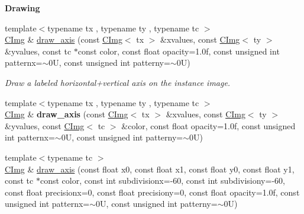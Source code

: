 \begin{Indent}{\bf Drawing}
\begin{DoxyCompactItemize}
\item 
\hypertarget{structcimg__library_1_1_c_img_a51d3f13753cc1b69c8250441dad0fb20}{{\footnotesize template$<$typename tx , typename ty , typename tc $>$ }\\\hyperlink{structcimg__library_1_1_c_img}{C\-Img} \& \hyperlink{structcimg__library_1_1_c_img_a51d3f13753cc1b69c8250441dad0fb20}{draw\-\_\-axis} (const \hyperlink{structcimg__library_1_1_c_img}{C\-Img}$<$ tx $>$ \&xvalues, const \hyperlink{structcimg__library_1_1_c_img}{C\-Img}$<$ ty $>$ \&yvalues, const tc $\ast$const color, const float opacity=1.\-0f, const unsigned int patternx=$\sim$0\-U, const unsigned int patterny=$\sim$0\-U)}\label{structcimg__library_1_1_c_img_a51d3f13753cc1b69c8250441dad0fb20}

\begin{DoxyCompactList}\small\item\em Draw a labeled horizontal+vertical axis on the instance image. \end{DoxyCompactList}\item 
\hypertarget{structcimg__library_1_1_c_img_aefc796b675e3315430ff8f17c8b224e6}{{\footnotesize template$<$typename tx , typename ty , typename tc $>$ }\\\hyperlink{structcimg__library_1_1_c_img}{C\-Img} \& {\bfseries draw\-\_\-axis} (const \hyperlink{structcimg__library_1_1_c_img}{C\-Img}$<$ tx $>$ \&xvalues, const \hyperlink{structcimg__library_1_1_c_img}{C\-Img}$<$ ty $>$ \&yvalues, const \hyperlink{structcimg__library_1_1_c_img}{C\-Img}$<$ tc $>$ \&color, const float opacity=1.\-0f, const unsigned int patternx=$\sim$0\-U, const unsigned int patterny=$\sim$0\-U)}\label{structcimg__library_1_1_c_img_aefc796b675e3315430ff8f17c8b224e6}

\item 
\hypertarget{structcimg__library_1_1_c_img_a0fa9fad3f494231a4570ba7908731b1f}{{\footnotesize template$<$typename tc $>$ }\\\hyperlink{structcimg__library_1_1_c_img}{C\-Img} \& \hyperlink{structcimg__library_1_1_c_img_a0fa9fad3f494231a4570ba7908731b1f}{draw\-\_\-axis} (const float x0, const float x1, const float y0, const float y1, const tc $\ast$const color, const int subdivisionx=-\/60, const int subdivisiony=-\/60, const float precisionx=0, const float precisiony=0, const float opacity=1.\-0f, const unsigned int patternx=$\sim$0\-U, const unsigned int patterny=$\sim$0\-U)}\label{structcimg__library_1_1_c_img_a0fa9fad3f494231a4570ba7908731b1f}


\end{DoxyCompactItemize}
\end{Indent}
